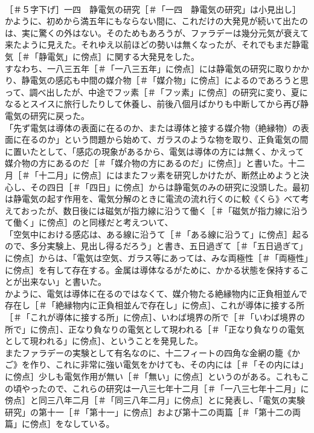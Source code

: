 \documentclass[8pt]{extreport}
\begin{document}
\begin{CJK}{UTF8}{min}
\\	［＃５字下げ］一四　静電気の研究［＃「一四　静電気の研究」は小見出し］
\\	かように、初めから満五年にもならない間に、これだけの大発見が続いて出たのは、実に驚くの外はない。そのためもあろうが、ファラデーは幾分元気が衰えて来たように見えた。それゆえ以前ほどの勢いは無くなったが、それでもまだ静電気［＃「静電気」に傍点］に関する大発見をした。
\\	すなわち、一八三五年［＃「一八三五年」に傍点］には静電気の研究に取りかかり、静電気の感応も中間の媒介物［＃「媒介物」に傍点］によるのであろうと思って、調べ出したが、中途でフッ素［＃「フッ素」に傍点］の研究に変り、夏になるとスイスに旅行したりして休養し、前後八個月ばかりも中断してから再び静電気の研究に戻った。
\\	「先ず電気は導体の表面に在るのか、または導体と接する媒介物（絶縁物）の表面に在るのか」という問題から始めて、ガラスのような物を取り、正負電気の間に置いたとして、「感応の現象があるから、電気は導体の方には無く、かえって媒介物の方にあるのだ［＃「媒介物の方にあるのだ」に傍点］」と書いた。十二月［＃「十二月」に傍点］にはまたフッ素を研究しかけたが、断然止めようと決心し、その四日［＃「四日」に傍点］からは静電気のみの研究に没頭した。最初は静電気の起す作用を、電気分解のときに電流の流れ行くのに較《くら》べて考えておったが、数日後には磁気が指力線に沿うて働く［＃「磁気が指力線に沿うて働く」に傍点］のと同様だと考えついて、
\\	「空気中における感応は、ある線に沿うて［＃「ある線に沿うて」に傍点］起るので、多分実験上、見出し得るだろう」と書き、五日過ぎて［＃「五日過ぎて」に傍点］からは、「電気は空気、ガラス等にあっては、みな両極性［＃「両極性」に傍点］を有して存在する。金属は導体なるがために、かかる状態を保持することが出来ない」と書いた。
\\	かように、電気は導体に在るのではなくて、媒介物たる絶縁物内に正負相並んで存在し［＃「絶縁物内に正負相並んで存在し」に傍点］、これが導体に接する所［＃「これが導体に接する所」に傍点］、いわば境界の所で［＃「いわば境界の所で」に傍点］、正なり負なりの電気として現われる［＃「正なり負なりの電気として現われる」に傍点］、ということを発見した。
\\	またファラデーの実験として有名なのに、十二フィートの四角な金網の籠《かご》を作り、これに非常に強い電気をかけても、その内には［＃「その内には」に傍点］少しも電気作用が無い［＃「無い」に傍点］というのがある。これもこの頃やったので、これらの研究は一八三七年十二月［＃「一八三七年十二月」に傍点］と同三八年二月［＃「同三八年二月」に傍点］とに発表し、「電気の実験研究」の第十一［＃「第十一」に傍点］および第十二の両篇［＃「第十二の両篇」に傍点］をなしている。

\end{CJK}
\end{document}
